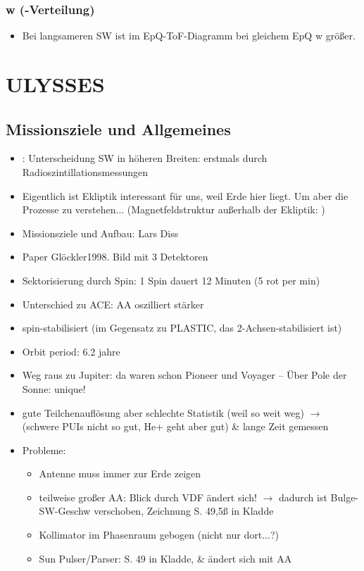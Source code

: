 \documentclass[]{article}
\begin{document}
\subsubsection{w (-Verteilung)}
\begin{itemize}
	\item Bei langsameren SW ist im EpQ-ToF-Diagramm bei gleichem EpQ w größer.
\end{itemize}
%
%
%
\newpage
\section{ULYSSES}
	\subsection{Missionsziele und Allgemeines}
	\begin{itemize}
		\item  \cite[6.1.7]{prlss_2004}: Unterscheidung SW in höheren Breiten: erstmals durch Radioszintillationsmessungen
		\item Eigentlich ist Ekliptik interessant für uns, weil Erde hier liegt. Um aber die Prozesse zu verstehen... (Magnetfeldstruktur außerhalb der Ekliptik: \cite[ch. 6.2.3]{prlss_2004})
		\item Missionsziele und Aufbau: Lars Diss
		\item Paper Glöckler1998. Bild mit 3 Detektoren
		\item Sektorisierung durch Spin: 1 Spin dauert 12 Minuten (5 rot per min)
		\item Unterschied zu ACE: AA oszilliert stärker
		\item spin-stabilisiert (im Gegensatz zu PLASTIC, das 2-Achsen-stabilisiert ist)
		\item Orbit period: 6.2 jahre
		\item Weg raus zu Jupiter: da waren schon Pioneer und Voyager -- Über Pole der Sonne: unique!
		\item gute Teilchenauflösung aber schlechte Statistik (weil so weit weg) $\rightarrow$ (schwere PUIs nicht so gut, He+ geht aber gut) \& lange Zeit gemessen
		\item Probleme:
		\begin{itemize}
			\item Antenne muss immer zur Erde zeigen
			\item teilweise großer AA: Blick durch VDF ändert sich! $\rightarrow$ dadurch ist Bulge-SW-Geschw verschoben, Zeichnung S. 49,5ß in Kladde
			\item Kollimator im Phasenraum gebogen (nicht nur dort...?)
			\item Sun Pulser/Parser: S. 49 in Kladde, \& ändert sich mit AA
		\end{itemize}
	\end{itemize}
\end{document}
